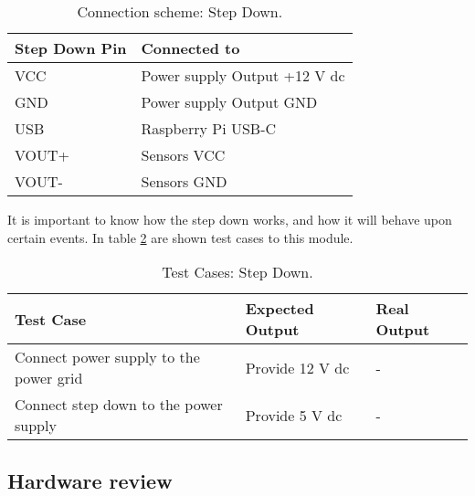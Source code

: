 \begin{table}[H]
	\centering
	\begin{tabular}{|m{5cm}|m{6cm}|}
		\hline
		\textbf{Step Down Pin} & \textbf{Connected to}
		\\\hline\hline
		
		VCC & Power supply Output +12 V \ac{dc}
		\\\hline
		GND & Power supply Output GND
		\\\hline
		USB & Raspberry Pi USB-C
		\\\hline
		VOUT+ & Sensors VCC
		\\\hline
		VOUT- & Sensors GND
		\\\hline
	\end{tabular}
	
	\caption{Connection scheme: Step Down.}
	\label{table:connect_power}
\end{table}

It is important to know how the step down works, and how it will behave upon certain events. In table \ref{table:test_step_down} are shown test cases to this module.

\begin{table}[H]
	\centering
	\resizebox{\columnwidth}{!}
	{
		\begin{tabular}{|m{3cm}|m{5cm}||m{5cm}|}
			\hline
			\textbf{Test Case} & \textbf{Expected Output} & \textbf{Real Output}
			\\\hline\hline
			Connect power supply to the power grid & Provide 12 V \ac{dc} & -
			\\\hline
			Connect step down to the power supply & Provide 5 V \ac{dc} & -
			\\\hline
		\end{tabular}
	}
	\caption{Test Cases: Step Down.}
	\label{table:test_step_down}
\end{table}
\subsection{Hardware review} %
